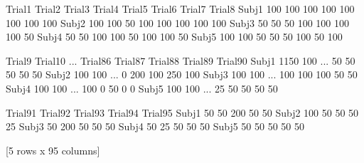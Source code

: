 \documentclass[letterpaper,10pt,english]{jupyterBook}
\begin{document}
\begin{sphinxVerbatim}[commandchars=\\\{\}]
        Trial1  Trial2  Trial3  Trial4  Trial5  Trial6  Trial7  Trial8  \PYGZbs{}
Subj\PYGZus{}1     100     100     100     100     100     100     100     100   
Subj\PYGZus{}2     100     100      50     100     100     100     100     100   
Subj\PYGZus{}3      50      50      50     100     100     100     100     \PYGZhy{}50   
Subj\PYGZus{}4      50      50     100     100     \PYGZhy{}50     100     100      50   
Subj\PYGZus{}5     100     100      50      50      50     100     \PYGZhy{}50     100   

        Trial9  Trial10  ...  Trial86  Trial87  Trial88  Trial89  Trial90  \PYGZbs{}
Subj\PYGZus{}1   \PYGZhy{}1150      100  ...       50       50       50       50       50   
Subj\PYGZus{}2     100      100  ...        0     \PYGZhy{}200      100     \PYGZhy{}250      100   
Subj\PYGZus{}3     100      100  ...      100      100      100       50       50   
Subj\PYGZus{}4     100      100  ...      100        0       50        0        0   
Subj\PYGZus{}5     100      100  ...      \PYGZhy{}25       50       50       50       50   

        Trial91  Trial92  Trial93  Trial94  Trial95  
Subj\PYGZus{}1       50       50     \PYGZhy{}200       50       50  
Subj\PYGZus{}2      100       50       50       50       25  
Subj\PYGZus{}3       50     \PYGZhy{}200       50       50       50  
Subj\PYGZus{}4       50       25       50       50       50  
Subj\PYGZus{}5       50       50       50       50       50  

[5 rows x 95 columns]
\end{sphinxVerbatim}

\begin{sphinxVerbatim}[commandchars=\\\{\}]
  
  
  
\end{sphinxVerbatim}
\end{document}
